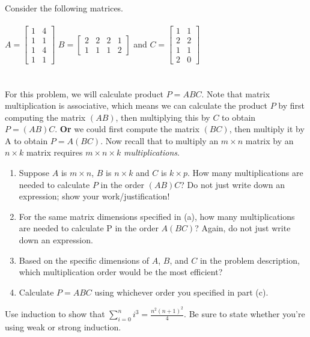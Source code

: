 \documentclass[11pt]{amsart}
\newcommand{\be}{\begin{enumerate}}
\newcommand{\ee}{\end{enumerate}}
\begin{document}
\item  Consider the following matrices. \\\\
$A=\begin{bmatrix} 1&4\\ 1&1\\ 1&4\\ 1&1 \end{bmatrix}$
$B=\begin{bmatrix} 2&2&2&1\\ 1&1&1&2\end{bmatrix}$ and 
$C=\begin{bmatrix} 1&1\\ 2&2\\ 1&1\\ 2&0\end{bmatrix}$\\\\\\
For this problem, we will calculate product $P=ABC$. Note that matrix multiplication is associative, which means we can calculate the product $P$ by first computing the matrix $(AB)$, then multiplying this by $C$ to obtain $P=(AB)C$. \textbf{Or} we could first compute the matrix $(BC)$, then multiply it by A to obtain $P=A(BC)$. Now recall that to multiply an $m\times n$ matrix by an $n\times k$ matrix requires $m\times n\times k$ \textit{multiplications}.\\
	\be
		\item Suppose $A$ is $m\times n$, $B$ is $n\times k$ and $C$ is $k\times p$. How many multiplications are needed to calculate $P$ in the order $(AB)C$? Do not just write down an expression; show your work/justification!
		\item For the same matrix dimensions specified in (a), how many multiplications are needed to calculate P in the order $A(BC)$? Again, do not just write down an expression.
		\item Based on the specific dimensions of $A$, $B$, and $C$ in the problem description, which multiplication order would be the most efficient?
		\item Calculate $P=ABC$ using whichever order you specified in part (c).
	\ee

	\begin{sol}
\end{sol}


\item Use induction to show that $\sum_{i=0}^n i^3= \frac{n^2(n+1)^2}{4}$.
Be sure to state whether you're using weak or strong induction.
	\begin{sol}
\end{sol}
\end{document}
